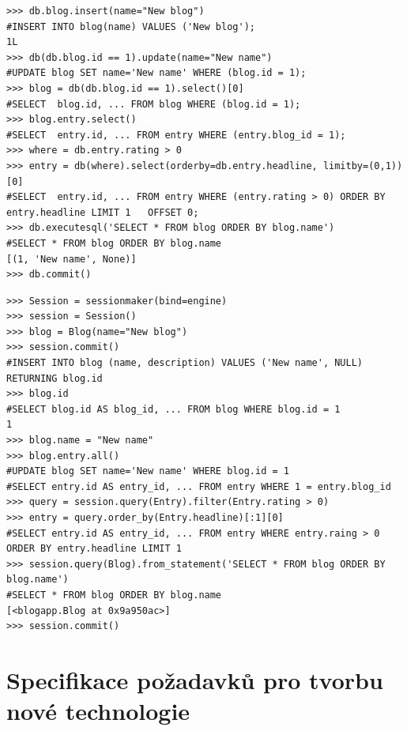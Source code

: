 \documentclass[ing,male,java,dept456]{diploma}						%
\begin{document}
\begin{lstlisting}[style=custompython, label=src:w2p-query, caption={Ukázka práce s daty ve web2py DBAL}]
>>> db.blog.insert(name="New blog")
#INSERT INTO blog(name) VALUES ('New blog');
1L
>>> db(db.blog.id == 1).update(name="New name")
#UPDATE blog SET name='New name' WHERE (blog.id = 1);
>>> blog = db(db.blog.id == 1).select()[0]
#SELECT  blog.id, ... FROM blog WHERE (blog.id = 1);
>>> blog.entry.select()
#SELECT  entry.id, ... FROM entry WHERE (entry.blog_id = 1);
>>> where = db.entry.rating > 0
>>> entry = db(where).select(orderby=db.entry.headline, limitby=(0,1))[0]
#SELECT  entry.id, ... FROM entry WHERE (entry.rating > 0) ORDER BY entry.headline LIMIT 1   OFFSET 0; 
>>> db.executesql('SELECT * FROM blog ORDER BY blog.name')
#SELECT * FROM blog ORDER BY blog.name
[(1, 'New name', None)]
>>> db.commit()
\end{lstlisting}
\clearpage

\begin{lstlisting}[style=custompython, label=src:sqla-query, caption={Ukázka práce s daty v SQLAlchemy}]
>>> Session = sessionmaker(bind=engine)
>>> session = Session()
>>> blog = Blog(name="New blog")
>>> session.commit()
#INSERT INTO blog (name, description) VALUES ('New name', NULL) RETURNING blog.id
>>> blog.id
#SELECT blog.id AS blog_id, ... FROM blog WHERE blog.id = 1
1
>>> blog.name = "New name"
>>> blog.entry.all()
#UPDATE blog SET name='New name' WHERE blog.id = 1
#SELECT entry.id AS entry_id, ... FROM entry WHERE 1 = entry.blog_id
>>> query = session.query(Entry).filter(Entry.rating > 0)
>>> entry = query.order_by(Entry.headline)[:1][0]
#SELECT entry.id AS entry_id, ... FROM entry WHERE entry.raing > 0 ORDER BY entry.headline LIMIT 1
>>> session.query(Blog).from_statement('SELECT * FROM blog ORDER BY blog.name')
#SELECT * FROM blog ORDER BY blog.name
[<blogapp.Blog at 0x9a950ac>]
>>> session.commit()
\end{lstlisting}

\section{Specifikace požadavků pro tvorbu nové technologie}
\label{sec:Design}
\end{document}
